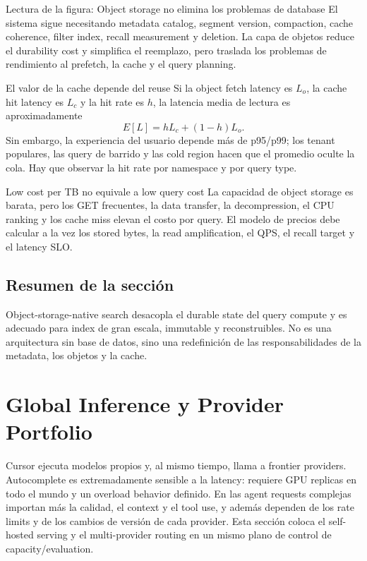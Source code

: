 \documentclass[a4paper]{article}
\begin{document}
\begin{knowledgebox}{Lectura de la figura: Object storage no elimina los problemas de database}
El sistema sigue necesitando metadata catalog, segment version, compaction, cache coherence, filter index, recall measurement y deletion. La capa de objetos reduce el durability cost y simplifica el reemplazo, pero traslada los problemas de rendimiento al prefetch, la cache y el query planning.
\end{knowledgebox}

\begin{importantbox}{El valor de la cache depende del reuse}
Si la object fetch latency es $L_o$, la cache hit latency es $L_c$ y la hit rate es $h$, la latencia media de lectura es aproximadamente
\[
E[L]=hL_c+(1-h)L_o.
\]
Sin embargo, la experiencia del usuario depende más de p95/p99; los tenant populares, las query de barrido y las cold region hacen que el promedio oculte la cola. Hay que observar la hit rate por namespace y por query type.
\end{importantbox}

\begin{warningbox}{Low cost per TB no equivale a low query cost}
La capacidad de object storage es barata, pero los GET frecuentes, la data transfer, la decompression, el CPU ranking y los cache miss elevan el costo por query. El modelo de precios debe calcular a la vez los stored bytes, la read amplification, el QPS, el recall target y el latency SLO.
\end{warningbox}

\subsection{Resumen de la sección}

Object-storage-native search desacopla el durable state del query compute y es adecuado para index de gran escala, immutable y reconstruibles. No es una arquitectura sin base de datos, sino una redefinición de las responsabilidades de la metadata, los objetos y la cache.
\section{Global Inference y Provider Portfolio}

Cursor ejecuta modelos propios y, al mismo tiempo, llama a frontier providers. Autocomplete es extremadamente sensible a la latency: requiere GPU replicas en todo el mundo y un overload behavior definido. En las agent requests complejas importan más la calidad, el context y el tool use, y además dependen de los rate limits y de los cambios de versión de cada provider. Esta sección coloca el self-hosted serving y el multi-provider routing en un mismo plano de control de capacity/evaluation.
\end{document}

